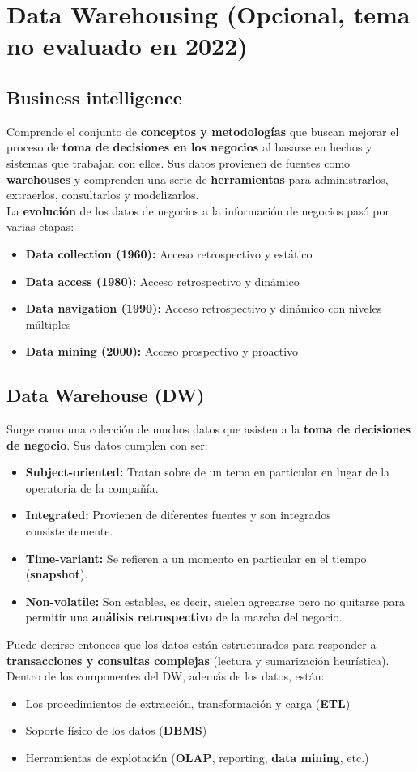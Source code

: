 \section*{Data Warehousing (Opcional, tema no evaluado en 2022)}
\subsection*{Business intelligence}
Comprende el conjunto de \textbf{conceptos y metodologías} que buscan mejorar el proceso de \textbf{toma de decisiones en los negocios} al basarse en hechos y sistemas que trabajan con ellos. Sus datos provienen de fuentes como \textbf{warehouses} y comprenden una serie de \textbf{herramientas} para administrarlos, extraerlos, consultarlos y modelizarlos. \\
La \textbf{evolución} de los datos de negocios a la información de negocios pasó por varias etapas:
\begin{itemize}
    \item \textbf{Data collection (1960):} Acceso retrospectivo y estático
    \item \textbf{Data access (1980):} Acceso retrospectivo y dinámico
    \item \textbf{Data navigation (1990):} Acceso retrospectivo y dinámico con niveles múltiples
    \item \textbf{Data mining (2000):} Acceso prospectivo y proactivo
\end{itemize}

\subsection*{Data Warehouse (DW)}
Surge como una colección de muchos datos que asisten a la \textbf{toma de decisiones de negocio}. Sus datos cumplen con ser:
\begin{itemize}
    \item \textbf{Subject-oriented:} Tratan sobre de un tema en particular en lugar de la operatoria de la compañía.
    \item \textbf{Integrated:} Provienen de diferentes fuentes y son integrados consistentemente.
    \item \textbf{Time-variant:} Se refieren a un momento en particular en el tiempo (\textbf{snapshot}).
    \item \textbf{Non-volatile:} Son estables, es decir, suelen agregarse pero no quitarse para permitir una \textbf{análisis retrospectivo} de la marcha del negocio.
\end{itemize}
Puede decirse entonces que los datos están estructurados para responder a \textbf{transacciones y consultas complejas} (lectura y sumarización heurística). \\
Dentro de los componentes del DW, además de los datos, están:
\begin{itemize} 
    \item Los procedimientos de extracción, transformación y carga (\textbf{ETL})
    \item Soporte físico de los datos (\textbf{DBMS})
    \item Herramientas de explotación (\textbf{OLAP}, reporting, \textbf{data mining}, etc.)
\end{itemize}

